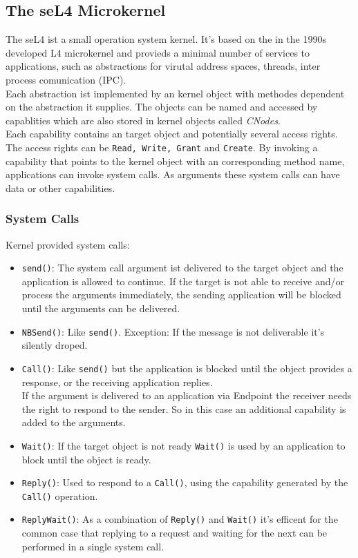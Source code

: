 \documentclass[11pt,a4paper,twoside]{article}
\begin{document}
	\subsection{The seL4 Microkernel}\label{sec:seL4}
	The seL4 \cite{Manual} ist a small operation system kernel. It's based on the in the 1990s developed L4 microkernel and provieds a minimal number of services to applications, such as abstractions for virutal address spaces, threads, inter process comunication (IPC). \\
	Each abstraction ist implemented by an kernel object with methodes dependent on the abstraction it supplies. The objects can be named and accessed by capablities which are also stored in kernel objects called \textit{CNodes}. \\
	Each capability contains an target object and potentially several access rights. The access rights can be \texttt{Read, Write, Grant} and \texttt{Create}. By invoking a capability that points to the kernel object  with an corresponding method name, applications can invoke system calls. As arguments these system calls can have data or other capabilities. 
	\subsubsection{System Calls}
	Kernel provided system calls:
	\begin{itemize}
	\item \texttt{send()}: The system call argument ist delivered to the target object and the application is allowed to continue. If the target is not able to receive and/or process the arguments immediately, the sending application will be blocked until the arguments can be delivered.
	\item \texttt{NBSend()}: Like \texttt{send()}. Exception: If the message is not deliverable it's silently droped.
	\item \texttt{Call()}: Like \texttt{send()} but the application is blocked until the object provides a response, or the receiving application replies. \\
	If the argument is delivered to an application via Endpoint the receiver needs the right to respond to the sender. So in this case an additional capability is added to the arguments. 
	\item \texttt{Wait()}: If the target object is not ready \texttt{Wait()} is used by an application to block until the object is ready. 
	\item \texttt{Reply()}: Used to respond to a \texttt{Call()}, using the capability generated by the \texttt{Call()} operation.
	\item \texttt{ReplyWait()}: As a combination of \texttt{Reply()} and \texttt{Wait()} it's efficent for the common case that replying to a request and waiting for the next can be performed in a single system call. 
	\end{itemize}
\end{document}
